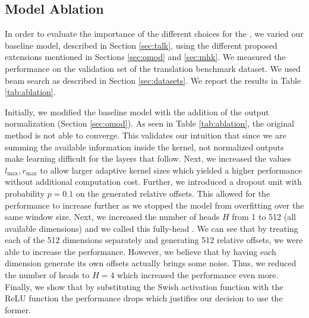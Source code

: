 \documentclass{article}
\begin{document}
\subsection{Model Ablation}

In order to evaluate the importance of the different choices for the \talkconvfulls{}, we varied our baseline model, described in Section \ref{sec:talk}, using the different proposed extensions mentioned in Sections \ref{sec:omod} and \ref{sec:mhk}. We measured the performance on the validation set of the \iwslt{} translation benchmark dataset. We used beam search as described in Section \ref{sec:datasets}. We report the results in Table \ref{tab:ablation}.

Initially, we modified the baseline model with the addition of the output normalization (Section \ref{sec:omod}). As seen in Table \ref{tab:ablation}, the original method is not able to converge. This validates our intuition that since we are summing the available information inside the kernel, not normalized outputs make learning difficult for the layers that follow. Next, we increased the values $l_\text{max},r_\text{max}$ to allow larger adaptive kernel sizes which yielded a higher performance without additional computation cost. Further, we introduced a dropout unit with probability $p=0.1$ on the generated relative offsets. This allowed for the performance to increase further as we stopped the model from overfitting over the same window size. Next, we increased the number of heads $H$ from 1 to 512 (all available dimensions) and we called this fully-head \talkconvfull{}. We can see that by treating each of the 512 dimensions separately and generating 512 relative offsets, we were able to increase the performance. However, we believe that by having each dimension generate its own offsets actually brings some noise. Thus, we reduced the number of heads to $H=4$ which increased the performance even more. Finally, we show that by substituting the Swish activation function with the ReLU function the performance drops which justifies our decision to use the former.
\end{document}

